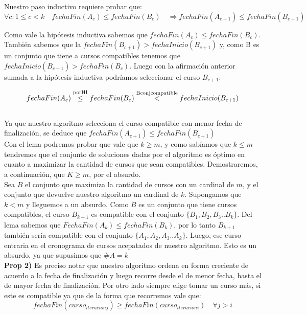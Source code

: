 Nuestro paso inductivo requiere probar que:
\begin{equation}
\forall c : 1 \le c < k \quad fechaFin(A_c)\leq fechaFin(B_c) \quad \Rightarrow fechaFin(A_{c+1})\leq fechaFin(B_{c+1})
\end{equation}

Como vale la hip\'otesis inductiva sabemos que $fechaFin(A_c)\leq fechaFin(B_c)$. Tambi\'en sabemos que la $fechaFin(B_{c+1}) > fechaInicio(B_{c+1})$ y, como B es un conjunto que tiene a cursos compatibles tenemos que $fechaInicio(B_{c+1}) > fechaFin(B_c)$. Luego con la afirmaci\'on anterior sumada a la hip\'otesis inductiva podr\'iamos seleccionar el curso $B_{c+1}$:

	  \begin{equation}
		fechaFin(A_c) \stackrel{\rm{por HI}} \le  fechaFin(B_c) \stackrel{\rm{B conj compatible}} < fechaInicio(B_{c+1})   \\ 
	\end{equation}
	  \\ Ya que nuestro algoritmo selecciona el curso compatible con menor fecha de finalización, se deduce
	  que $fechaFin(A_{c+1})\le fechaFin(B_{c+1})$ \Box \\
	  
	
Con el lema podremos probar que vale que $k\ge m$, y como sab\'iamos que $k\le m$ tendremos que el conjunto
de soluciones dadas por el algoritmo es \'optimo en cuanto a maximizar la cantidad de cursos que sean compatibles. Demostraremos, a continuación, que $K\ge m$, por el absurdo.\\ 

Sea $B$ el conjunto que maximiza la cantidad de cursos con un cardinal de $m$, y el conjunto que devuelve nuestro algoritmo un cardinal de $k$. Supongamos que $k<m$ y lleguemos a un absurdo.
Como $B$ es un conjunto que tiene cursos compatibles, el curso $B_{k+1}$ es compatible con el conjunto $\{B_1,B_2,B_3..B_k\}$. Del lema sabemos que $FechaFin(A_k) \le fechaFin(B_k)$, por lo tanto $B_{k+1}$ tambi\'en ser\'ia compatible con el conjunto $\{A_1,A_2,A_3..A_k\}$. Luego, ese curso entraria en el cronograma de cursos acepatados de nuestro algoritmo. Esto es un absurdo, ya que supusimos que $\#A = k$ \Box\\


\textbf{Prop 2)} Es preciso notar que nuestro algoritmo ordena en forma creciente de acuerdo a la fecha de finalizaci\'on y luego recorre desde el de menor fecha, hasta el de mayor fecha de finalizaci\'on. Por otro lado siempre elige tomar un curso m\'as, si este es compatible ya que de la forma que recorremos vale que:
\begin{equation}
fechaFin(curso_{iteracionj}) \geq fechaFin(curso_{iteracioni}) \quad \forall j>i
\end{equation}


